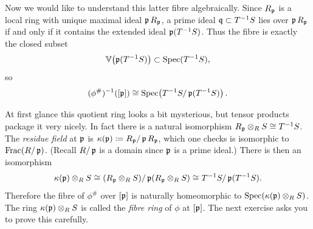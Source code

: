 \documentclass[Notebook.tex]{subfiles}
\begin{document}
Now we would like to understand this latter fibre algebraically. Since $R_{\fp}$ is a local ring with unique maximal ideal $\fp R_{\fp}$, a prime ideal $\fq\subset T^{-1}S$ lies over $\fp R_{\fp}$ if and only if it contains the extended ideal $\fp(T^{-1}S)$. Thus the fibre is exactly the closed subset
\[
\V\!\left(\fp(T^{-1}S)\right)\subset \Spec(T^{-1}S),
\]
so
\[
(\phi^{\#})^{-1}([\fp]) \cong \Spec\!\left(T^{-1}S/\fp(T^{-1}S)\right).
\]

At first glance this quotient ring looks a bit mysterious, but tensor products package it very nicely. In fact there is a natural isomorphism $R_{\fp}\otimes_R S \cong T^{-1}S$. The \emph{residue field} at $\fp$ is $\kappa(\fp)\coloneqq R_{\fp}/\fp R_{\fp}$, which one checks is isomorphic to $\Frac(R/\fp)$. (Recall $R/\fp$ is a domain since $\fp$ is a prime ideal.) There is then an isomorphism
\[
\kappa(\fp)\otimes_R S
\cong
(R_{\fp}\otimes_R S)/\fp(R_{\fp}\otimes_R S)
\cong
T^{-1}S/\fp(T^{-1}S).
\]
Therefore the fibre of $\phi^{\#}$ over $[\fp]$ is naturally homeomorphic to $\Spec(\kappa(\fp)\otimes_R S)$. The ring $\kappa(\fp)\otimes_R S$ is called the \emph{fibre ring} of $\phi$ at $[\fp]$. The next exercise asks you to prove this carefully.

\hrulefill

\newpage 
\end{document}
